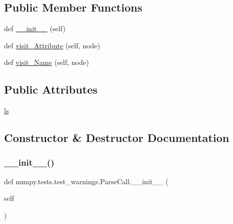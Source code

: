 \subsection*{Public Member Functions}
\begin{DoxyCompactItemize}
\item 
def \hyperlink{classnumpy_1_1tests_1_1test__warnings_1_1ParseCall_a1dfec921d623b80d93b31ec8baa02056}{\+\_\+\+\_\+init\+\_\+\+\_\+} (self)
\item 
def \hyperlink{classnumpy_1_1tests_1_1test__warnings_1_1ParseCall_a303e5d4afbebcc5e71bd0a52eac3c6af}{visit\+\_\+\+Attribute} (self, node)
\item 
def \hyperlink{classnumpy_1_1tests_1_1test__warnings_1_1ParseCall_aa460eeb525fbccf1d46160f802633214}{visit\+\_\+\+Name} (self, node)
\end{DoxyCompactItemize}
\subsection*{Public Attributes}
\begin{DoxyCompactItemize}
\item 
\hyperlink{classnumpy_1_1tests_1_1test__warnings_1_1ParseCall_aaa93000090d893047f9735c8a4e79ba5}{ls}
\end{DoxyCompactItemize}


\subsection{Constructor \& Destructor Documentation}
\mbox{\label{classnumpy_1_1tests_1_1test__warnings_1_1ParseCall_a1dfec921d623b80d93b31ec8baa02056}} 
\subsubsection{\texorpdfstring{\+\_\+\+\_\+init\+\_\+\+\_\+()}{\_\_init\_\_()}}
{\footnotesize\ttfamily def numpy.\+tests.\+test\+\_\+warnings.\+Parse\+Call.\+\_\+\+\_\+init\+\_\+\+\_\+ (\begin{DoxyParamCaption}\item[{}]{self }\end{DoxyParamCaption})}



